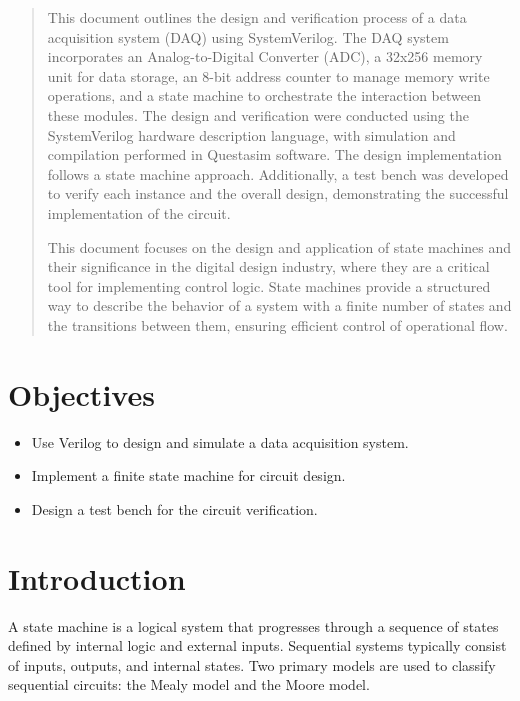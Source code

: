 \documentclass[conference]{IEEEtran}
\begin{document}
	
	\maketitle
	\begin{abstract}
    This document outlines the design and verification process of a data acquisition system (DAQ) using SystemVerilog. The DAQ system incorporates an Analog-to-Digital Converter (ADC), a 32x256 memory unit for data storage, an 8-bit address counter to manage memory write operations, and a state machine to orchestrate the interaction between these modules. The design and verification were conducted using the SystemVerilog hardware description language, with simulation and compilation performed in Questasim software. The design implementation follows a state machine approach. Additionally, a test bench was developed to verify each instance and the overall design, demonstrating the successful implementation of the circuit.

	This document focuses on the design and application of state machines and their significance in the digital design industry, where they are a critical tool for implementing control logic. State machines provide a structured way to describe the behavior of a system with a finite number of states and the transitions between them, ensuring efficient control of operational flow.

	\end{abstract}
	
	\section{Objectives}	
	\begin{itemize}
		\item Use Verilog to design and simulate a data acquisition system.
		\item Implement a finite state machine for circuit design.
		\item Design a test bench for the circuit verification.
	\end{itemize}
	
	\section{Introduction}
	A state machine is a logical system that progresses through a sequence of states defined by internal logic and external inputs.\cite{floyd_fundamentos_nodate} Sequential systems typically consist of inputs, outputs, and internal states. Two primary models are used to classify sequential circuits: the Mealy model and the Moore model.\cite{mano_digital_2002}
	
\end{document}
